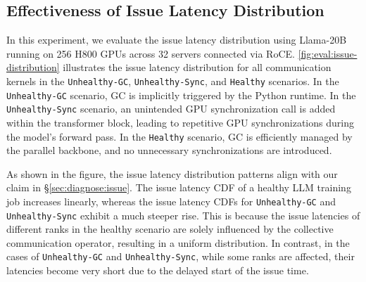 \subsection{Effectiveness of Issue Latency Distribution}
\label{sec:eval:issue}

In this experiment, we evaluate the issue latency distribution using Llama-20B running on 256 H800 GPUs across 32 servers connected via RoCE. \autoref{fig:eval:issue-distribution} illustrates the issue latency distribution for all communication kernels in the \texttt{Unhealthy-GC}, \texttt{Unhealthy-Sync}, and \texttt{Healthy} scenarios. In the \texttt{Unhealthy-GC} scenario, GC is implicitly triggered by the Python runtime. In the \texttt{Unhealthy-Sync} scenario, an unintended GPU synchronization call is added within the transformer block, leading to repetitive GPU synchronizations during the model’s forward pass. In the \texttt{Healthy} scenario, GC is efficiently managed by the parallel backbone, and no unnecessary synchronizations are introduced.


As shown in the figure, the issue latency distribution patterns align with our claim in \S\ref{sec:diagnose:issue}. The issue latency CDF of a healthy LLM training job increases linearly, whereas the issue latency CDFs for \texttt{Unhealthy-GC} and \texttt{Unhealthy-Sync} exhibit a much steeper rise. This is because the issue latencies of different ranks in the healthy scenario are solely influenced by the collective communication operator, resulting in a uniform distribution. In contrast, in the cases of \texttt{Unhealthy-GC} and \texttt{Unhealthy-Sync}, while some ranks are affected, their latencies become very short due to the delayed start of the issue time.

